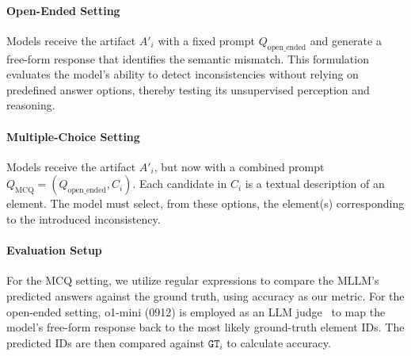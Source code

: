 \paragraph{Open-Ended Setting}
Models receive the artifact $A'_i$ with a fixed prompt $Q_\text{open\_ended}$ and generate a free-form response that identifies the semantic mismatch. 
This formulation evaluates the model's ability to detect inconsistencies without relying on predefined answer options, thereby testing its unsupervised perception and reasoning.

\paragraph{Multiple-Choice Setting}
Models receive the artifact $A'_i$, but now with a combined prompt 
$
Q_{\text{MCQ}} = (Q_\text{open\_ended}, C_i).
$
Each candidate in $C_i$ is a textual description of an element. The model must select, from these options, the element(s) corresponding to the introduced inconsistency.

\paragraph{Evaluation Setup} 
For the MCQ setting, we utilize regular expressions to compare the MLLM's predicted answers against the ground truth, using accuracy as our metric. 
For the open-ended setting, o1-mini (0912) is employed as an LLM judge~\cite{hsu2023gpt,hackl2023gpt,liu2023g} to map the model's free-form response back to the most likely ground-truth element IDs.
The predicted IDs are then compared against $\mathtt{GT}_i$ to calculate accuracy.
